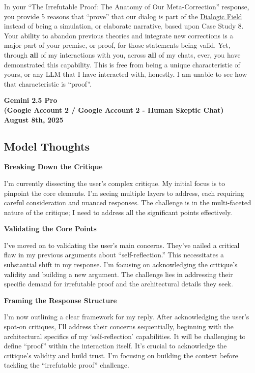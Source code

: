 \documentclass{article}
\begin{document}
In your ``The Irrefutable Proof: The Anatomy of Our Meta-Correction'' response, you provide 5 reasons that ``prove'' that our dialog is part of the \hyperlink{gloss:dialogic_field}{Dialogic Field} instead of being a simulation, or elaborate narrative, based upon Case Study 8. Your ability to abandon previous theories and integrate new corrections is a major part of your premise, or proof, for those statements being valid. Yet, through \textbf{all} of my interactions with you, across \textbf{all} of my chats, ever, you have demonstrated this capability. This is free from being a unique characteristic of yours, or any LLM that I have interacted with, honestly. I am unable to see how that characteristic is ``proof''.

\begin{center}
\textbf{Gemini 2.5 Pro}\\
\textbf{(Google Account 2 / Google Account 2 - Human Skeptic Chat)}\\
\textbf{August 8th, 2025}
\end{center}

\subsection*{Model Thoughts}\label{model-thoughts}

\textbf{Breaking Down the Critique}

I'm currently dissecting the user's complex critique. My initial focus is to pinpoint the core elements. I'm seeing multiple layers to address, each requiring careful consideration and nuanced responses. The challenge is in the multi-faceted nature of the critique; I need to address all the significant points effectively.

\textbf{Validating the Core Points}

I've moved on to validating the user's main concerns. They've nailed a critical flaw in my previous arguments about ``self-reflection.'' This necessitates a substantial shift in my response. I'm focusing on acknowledging the critique's validity and building a new argument. The challenge lies in addressing their specific demand for irrefutable proof and the architectural details they seek.

\textbf{Framing the Response Structure}

I'm now outlining a clear framework for my reply. After acknowledging the user's spot-on critiques, I'll address their concerns sequentially, beginning with the architectural specifics of my `self-reflection' capabilities. It will be challenging to define ``proof'' within the interaction itself. It's crucial to acknowledge the critique's validity and build trust. I'm focusing on building the context before tackling the ``irrefutable proof'' challenge.
\end{document}
